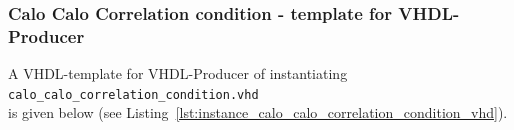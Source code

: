 \clearpage

\subsubsection{Calo Calo Correlation condition - template for VHDL-Producer}
A VHDL-template for VHDL-Producer of instantiating\\ \texttt{calo\_calo\_correlation\_condition.vhd}\\ is given below (see Listing~\ref{lst:instance_calo_calo_correlation_condition_vhd}).\\




